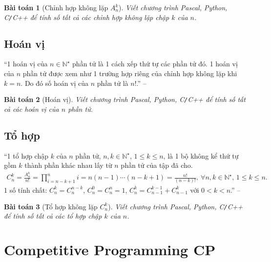\documentclass{article}
\newtheorem{baitoan}{Bài toán}
\begin{document}
\begin{baitoan}[Chỉnh hợp không lặp $A_n^k$]
	Viết chương trình {\sf Pascal, Python, C\texttt{/}C++} để tính số tất cả các chỉnh hợp không lặp chập $k$ của $n$.
\end{baitoan}

\subsection{Hoán vị}
``1 hoán vị của $n\in\mathbb{N}^\star$ phần tử là 1 cách xếp thứ tự các phần tử đó. 1 hoán vị của $n$ phần tử được xem như 1 trường hợp riêng của chỉnh hợp không lặp khi $k = n$. Do đó số hoán vị của $n$ phần tử là $n!$.'' -- \cite[Sect. 4.9, p. 21]{TLGK_chuyen_Tin_quyen_1}

\begin{baitoan}[Hoán vị]
	Viết chương trình {\sf Pascal, Python, C\texttt{/}C++} để tính số tất cả các hoán vị của $n$ phần tử.
\end{baitoan}

\subsection{Tổ hợp}
``1 tổ hợp chập $k$ của $n$ phần tử, $n,k\in\mathbb{N}^\star$, $1\le k\le n$, là 1 bộ không kể thứ tự gồm $k$ thành phần khác nhau lấy từ $n$ phần tử của tập đã cho.
\begin{align*}
	C_n^k = \frac{A_n^k}{n!} = \prod_{i=n-k+1}^n i = n(n - 1)\cdots(n - k + 1) = \frac{n!}{(n - k)!},\ \forall n,k\in\mathbb{N}^\star,\,1\le k\le n.
\end{align*}
1 số tính chất: $C_n^k =  C_n^{n-k}$, $C_n^0 = C_n^n = 1$, $C_n^k = C_{n-1}^{k-1} + C_{n-1}^k$ với $0 < k < n$.'' -- \cite[Sect. 4.10, p. 21]{TLGK_chuyen_Tin_quyen_1}

\begin{baitoan}[Tổ hợp không lặp $C_n^k$]
	Viết chương trình {\sf Pascal, Python, C\texttt{/}C++} để tính số tất cả các tổ hợp chập $k$ của $n$.
\end{baitoan}


\section{Competitive Programming CP}

\end{document}
